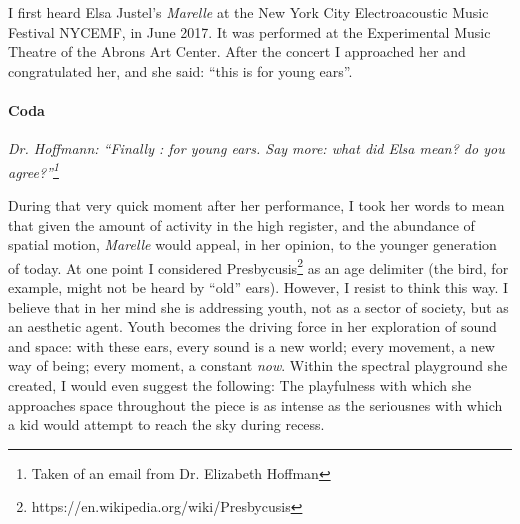 \documentclass{article}
\begin{document}
\bigskip
\bigskip

I first heard Elsa Justel's \textit{Marelle} at the New York City Electroacoustic Music Festival NYCEMF, in June 2017. It was performed at the Experimental Music Theatre of the Abrons Art Center. After the concert I approached her and congratulated her, and she said: ``this is for young ears''.
\bigskip
\bigskip
\paragraph{Coda}
\textit{
Dr. Hoffmann: ``Finally : for young ears.  Say more: what did Elsa mean? do you agree?''\footnote{Taken of an email from Dr. Elizabeth Hoffman}}
\bigskip

During that very quick moment after her performance, I took her words to mean that given the amount of activity in the high register, and the abundance of spatial motion, \emph{Marelle} would appeal, in her opinion, to the younger generation of today. At one point I considered Presbycusis\footnote{https://en.wikipedia.org/wiki/Presbycusis} as an age delimiter (the bird, for example, might not be heard by ``old'' ears). However, I resist to think this way. I believe that in her mind she is addressing youth, not as a sector of society, but as an aesthetic agent. Youth becomes the driving force in her exploration of sound and space: with these ears, every sound is a new world; every movement, a new way of being; every moment, a constant \emph{now}. Within the spectral playground she created, I would even suggest the following: The playfulness with which she approaches space throughout the piece is as intense as the seriousnes with which a kid would attempt to reach the sky during recess.


\end{document}
